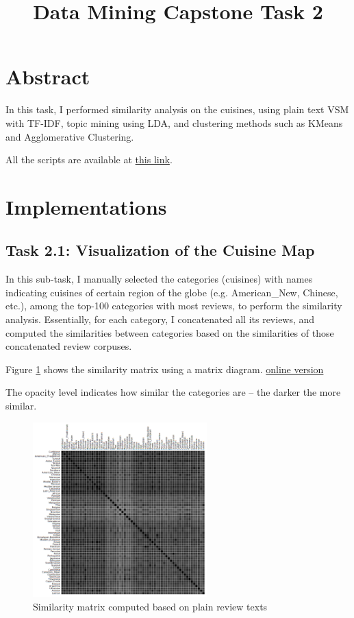 \documentclass[11pt]{article}
\title{Data Mining Capstone Task 2}
\begin{document}
\maketitle

\section{Abstract}
In this task, I performed similarity analysis on the cuisines, using plain text VSM with TF-IDF, topic mining using LDA, and clustering methods such as KMeans and Agglomerative Clustering.

All the scripts are available at \href{https://github.com/jiachengpan/dataminingcapstone}{this link}.

\section{Implementations}
\subsection{Task 2.1: Visualization of the Cuisine Map}
In this sub-task, I manually selected the categories (cuisines) with names indicating cuisines of certain region of the globe (e.g. American\_New, Chinese, etc.), among the top-100 categories with most reviews, to perform the similarity analysis.
Essentially, for each category, I concatenated all its reviews, and computed the similarities between categories based on the similarities of those concatenated review corpuses.

\vspace{1em}
Figure \ref{fig:text_repr} shows the similarity matrix using a matrix diagram.
\href{http://jiacheng-pan.me/standalone/datamining_capstone/task2/text_repr.html}{online version}

The opacity level indicates how similar the categories are -- the darker the more similar.

\begin{figure}[htp!]
  \centering
  \includegraphics[width=0.6\textwidth]{./img/text_repr.png}
  \caption{Similarity matrix computed based on plain review texts}
  \label{fig:text_repr}
\end{figure}
\end{document}
